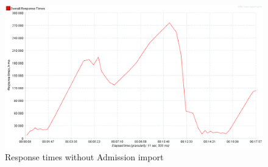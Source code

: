 	\begin{figure}[h]
		\label{fig:jmeter:response_times_over_time_250_without_admission_import}
		\centering
		\includegraphics[width=12cm]{figures/jmeter/response_times_over_time_250_without_admission_import}
		\caption{Response times without Admission import}
	\end{figure}